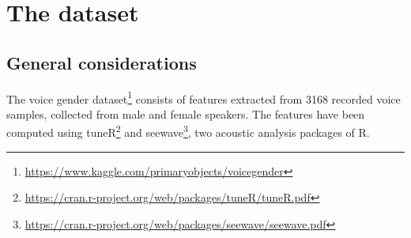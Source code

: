 
\chapter{The dataset}
\label{chap:dataset}

\section{General considerations}
\label{sec:gen_cons}
The voice gender dataset\footnote{\url{https://www.kaggle.com/primaryobjects/voicegender}} consists of features extracted from \num{3168} recorded voice samples, collected from male and female speakers. 
The features have been computed using tuneR\footnote{\url{https://cran.r-project.org/web/packages/tuneR/tuneR.pdf}} and seewave\footnote{\url{https://cran.r-project.org/web/packages/seewave/seewave.pdf}}, two acoustic analysis packages of R.

